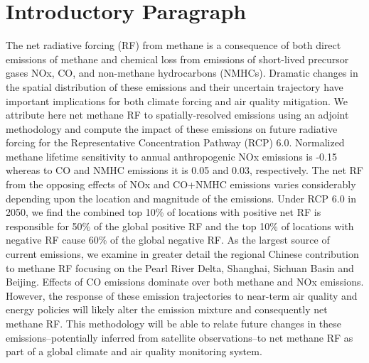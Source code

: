 \section*{Introductory Paragraph}

The net radiative forcing (RF) from methane is a consequence of both direct emissions of methane and chemical loss from emissions of short-lived precursor gases NOx, CO, and non-methane hydrocarbons (NMHCs). Dramatic changes in the spatial distribution of these emissions and their uncertain trajectory have important implications for both climate forcing and air quality mitigation.  We attribute here net methane RF  to spatially-resolved emissions using an adjoint methodology and compute the impact of these emissions on future radiative forcing for the Representative Concentration Pathway (RCP) 6.0.  Normalized methane lifetime sensitivity to annual anthropogenic NOx emissions is -0.15 whereas to CO and NMHC emissions it is 0.05 and 0.03, respectively. The net RF from the opposing effects of NOx and CO+NMHC emissions varies considerably depending upon the location and magnitude of the emissions.  Under RCP 6.0 in 2050,  we find the combined top 10\% of locations with positive net RF is responsible for 50\% of the global positive RF and the top 10\% of locations with negative RF cause 60\% of the global negative RF. As the largest source of current emissions, we examine in greater detail the regional Chinese contribution to methane RF focusing on the Pearl River Delta, Shanghai, Sichuan Basin and Beijing. Effects of CO emissions dominate over both methane and NOx emissions. However, the response of these emission trajectories to near-term air quality and energy policies will likely alter the emission mixture and consequently net methane RF. This methodology will be able to relate future changes in these emissions--potentially inferred from satellite observations--to net methane RF  as part of a global climate and air quality monitoring system. 